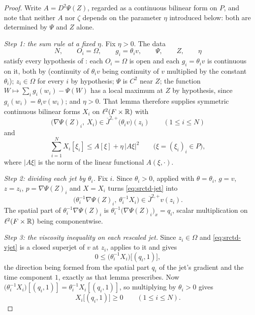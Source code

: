 \begin{proof}
Write $A=D^2\Psi(Z)$, regarded as a continuous bilinear form on $P$, and note
that neither $A$ nor $\zeta$ depends on the parameter $\eta$ introduced below:
both are determined by $\Psi$ and $Z$ alone.

\emph{Step 1: the sum rule at a fixed $\eta$.}
Fix $\eta>0$. The data
\[
  N,\qquad O_i=\Omega,\qquad g_i=\theta_i v,\qquad \Psi,\qquad Z,\qquad \eta
\]
satisfy every hypothesis of : each $O_i=\Omega$ is open and
each $g_i=\theta_i v$ is continuous on it, both by 
(continuity of $\theta_i v$ being continuity of $v$ multiplied by the constant
$\theta_i$); $z_i\in\Omega$ for every $i$ by hypothesis; $\Psi$ is $C^2$ near
$Z$; the function $W\mapsto\sum_i g_i(w_i)-\Psi(W)$ has a local maximum at $Z$
by hypothesis, since $g_i(w_i)=\theta_iv(w_i)$; and $\eta>0$. That lemma
therefore supplies symmetric continuous bilinear forms $X_i$ on
$\ell^2(F\times\mathbb{R})$ with
\begin{equation}\label{eq:srctd-jet}
  \bigl(\nabla\Psi(Z)_i,\ X_i\bigr)
   \in\overline J^{2,+}\bigl(\theta_i v\bigr)(z_i)
  \qquad(1\le i\le N)
\end{equation}
and
\begin{equation}\label{eq:srctd-matrix}
  \sum_{i=1}^NX_i[\xi_i]\le A[\xi]+\eta\,\bigl|A\xi\bigr|^2
  \qquad\bigl(\xi=(\xi_i)_i\in P\bigr),
\end{equation}
where $|A\xi|$ is the norm of the linear functional $A(\xi,\cdot)$.

\emph{Step 2: dividing each jet by $\theta_i$.}
Fix $i$. Since $\theta_i>0$,  applied with
$\theta=\theta_i$, $g=v$, $z=z_i$, $p=\nabla\Psi(Z)_i$ and $X=X_i$ turns
\eqref{eq:srctd-jet} into
\begin{equation}\label{eq:srctd-vjet}
  \bigl(\theta_i^{-1}\nabla\Psi(Z)_i,\ \theta_i^{-1}X_i\bigr)
   \in\overline J^{2,+}v(z_i).
\end{equation}
The spatial part of $\theta_i^{-1}\nabla\Psi(Z)_i$ is
$\theta_i^{-1}\bigl(\nabla\Psi(Z)_i\bigr)_x=q_i$, scalar multiplication on
$\ell^2(F\times\mathbb{R})$ being componentwise.

\emph{Step 3: the viscosity inequality on each rescaled jet.}
Since $z_i\in\Omega$ and \eqref{eq:srctd-vjet} is a closed superjet of $v$ at
$z_i$,  applies to it and gives
\[
  0\le\bigl(\theta_i^{-1}X_i\bigr)\bigl[(q_i,1)\bigr],
\]
the direction being formed from the spatial part $q_i$ of the jet's gradient and
the time component $1$, exactly as that lemma prescribes. Now
$\bigl(\theta_i^{-1}X_i\bigr)[(q_i,1)]=\theta_i^{-1}X_i[(q_i,1)]$, so
multiplying by $\theta_i>0$ gives
\begin{equation}\label{eq:srctd-each}
  X_i\bigl[(q_i,1)\bigr]\ge0\qquad(1\le i\le N).
\end{equation}


\end{proof}
